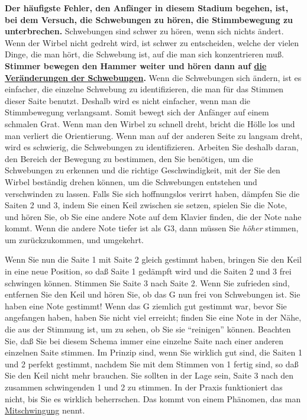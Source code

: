 \textbf{Der häufigste Fehler, den Anfänger in diesem Stadium begehen, ist, bei dem Versuch, die Schwebungen zu hören, die Stimmbewegung zu unterbrechen.}
 Schwebungen sind schwer zu hören, wenn sich nichts ändert.
 Wenn der Wirbel nicht gedreht wird, ist schwer zu entscheiden, welche der vielen Dinge, die man hört, die Schwebung ist, auf die man sich konzentrieren muß.
 \textbf{Stimmer bewegen den Hammer weiter und hören dann auf \underline{die Veränderungen der Schwebungen}.}
 Wenn die Schwebungen sich ändern, ist es einfacher, die einzelne Schwebung zu identifizieren, die man für das Stimmen dieser Saite benutzt.
 Deshalb wird es nicht einfacher, wenn man die Stimmbewegung verlangsamt.
 Somit bewegt sich der Anfänger auf einem schmalen Grat.
 Wenn man den Wirbel zu schnell dreht, bricht die Hölle los und man verliert die Orientierung.
 Wenn man auf der anderen Seite zu langsam dreht, wird es schwierig, die Schwebungen zu identifizieren.
 Arbeiten Sie deshalb daran, den Bereich der Bewegung zu bestimmen, den Sie benötigen, um die Schwebungen zu erkennen und die richtige Geschwindigkeit, mit der Sie den Wirbel beständig drehen können, um die Schwebungen entstehen und verschwinden zu lassen.
 Falls Sie sich hoffnungslos verirrt haben, dämpfen Sie die Saiten 2 und 3, indem Sie einen Keil zwischen sie setzen, spielen Sie die Note, und hören Sie, ob Sie eine andere Note auf dem Klavier finden, die der Note nahe kommt.
 Wenn die andere Note tiefer ist als G3, dann müssen Sie \textit{höher} stimmen, um zurückzukommen, und umgekehrt.
 

Wenn Sie nun die Saite 1 mit Saite 2 gleich gestimmt haben, bringen Sie den Keil in eine neue Position, so daß Saite 1 gedämpft wird und die Saiten 2 und 3 frei schwingen können.
 Stimmen Sie Saite 3 nach Saite 2.
 Wenn Sie zufrieden sind, entfernen Sie den Keil und hören Sie, ob das G nun frei von Schwebungen ist.
 Sie haben eine Note gestimmt!
 Wenn das G ziemlich gut gestimmt war, bevor Sie angefangen haben, haben Sie nicht viel erreicht; finden Sie eine Note in der Nähe, die aus der Stimmung ist, um zu sehen, ob Sie sie \enquote{reinigen} können.
 Beachten Sie, daß Sie bei diesem Schema immer eine einzelne Saite nach einer anderen einzelnen Saite stimmen.
 Im Prinzip sind, wenn Sie wirklich gut sind, die Saiten 1 und 2 perfekt gestimmt, nachdem Sie mit dem Stimmen von 1 fertig sind, so daß Sie den Keil nicht mehr brauchen.
 Sie sollten in der Lage sein, Saite 3 nach den zusammen schwingenden 1 und 2 zu stimmen.
 In der Praxis funktioniert das nicht, bis Sie es wirklich beherrschen.
 Das kommt von einem Phänomen, das man \hyperlink{mitschwingung}{Mitschwingung} nennt.
 
